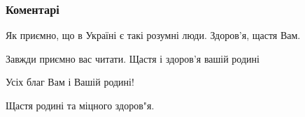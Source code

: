  
 
 
 
 
\subsubsection{Коментарі}
\label{sec:26_07_2021.fb.ribchinskij_evgenij.1.ukrainec_po_suti_vazhno.cmt}

\begin{itemize}
 
Як приємно, що в Україні є такі розумні люди. Здоров'я, щастя Вам.

 
Завжди приємно вас читати. Щастя і здоров'я вашій родині


 
Усіх благ Вам і Вашій родині!

 
Щастя родині та міцного здоров"я.

 

\end{itemize}
